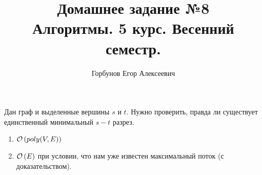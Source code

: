 

\title{Домашнее задание №8 \\ Алгоритмы. 5 курс. Весенний семестр.}
\author{Горбунов Егор Алексеевич}


\maketitle
\begin{task}[1]
Дан граф и выделенные вершины $s$ и $t$. Нужно проверить, правда ли существует единственный минимальный $s-t$ разрез.
\begin{enumerate}
	\item $\mathcal{O}\left(poly(V, E)\right)$
	\item $\mathcal{O}\left(E\right)$ при условии, что нам уже известен максимальный поток (с доказательством).
\end{enumerate}
\end{task}

